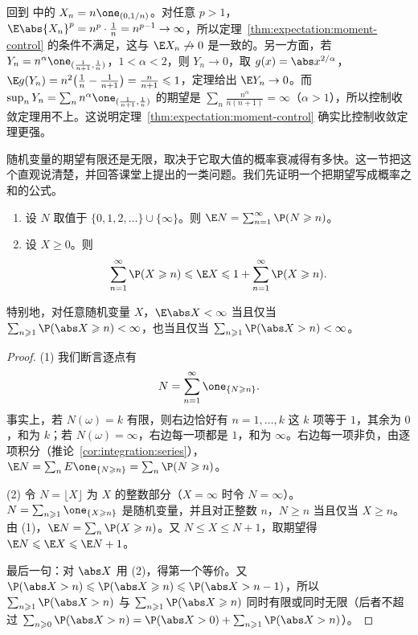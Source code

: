 \begin{example}
回到 中的 $X_n=n\one_{(0,1/n)}$。对任意 $p>1$，$\E\abs{X_n}^p=n^p\cdot\frac1n=n^{p-1}\to\infty$，所以定理~\ref{thm:expectation:moment-control} 的条件不满足，这与 $\E X_n\not\to0$ 是一致的。另一方面，若 $Y_n=n^\alpha\one_{(\frac1{n+1},\frac1n)}$，$1<\alpha<2$，则 $Y_n\to0$，取 $g(x)=\abs x^{2/\alpha}$，$\E g(Y_n)=n^2\bigl(\frac1n-\frac1{n+1}\bigr)=\frac n{n+1}\leqslant1$，定理给出 $\E Y_n\to0$。而 $\sup_nY_n=\sum_nn^\alpha\one_{(\frac1{n+1},\frac1n)}$ 的期望是 $\sum_n\frac{n^\alpha}{n(n+1)}=\infty$（$\alpha>1$），所以控制收敛定理用不上。这说明定理~\ref{thm:expectation:moment-control} 确实比控制收敛定理更强。
\end{example}


随机变量的期望有限还是无限，取决于它取大值的概率衰减得有多快。这一节把这个直观说清楚，并回答课堂上提出的一类问题。我们先证明一个把期望写成概率之和的公式。

\begin{proposition}[期望与尾概率之和]\label{prop:expectation:tail-sum}
\begin{enumerate}
\item 设 $N$ 取值于 $\{0,1,2,\dots\}\cup\{\infty\}$。则 $\E N=\sum_{n=1}^\infty \P(N\geqslant n)$。
\item 设 $X\geqslant0$。则
\[
\sum_{n=1}^\infty \P(X\geqslant n)\leqslant \E X\leqslant1+\sum_{n=1}^\infty \P(X\geqslant n).
\]
\end{enumerate}
特别地，对任意随机变量 $X$，$\E\abs X<\infty$ 当且仅当 $\sum_{n\geqslant1}\P(\abs X\geqslant n)<\infty$，也当且仅当 $\sum_{n\geqslant1}\P(\abs X>n)<\infty$。
\end{proposition}
\begin{proof}
(1) 我们断言逐点有
\[
N=\sum_{n=1}^\infty\one_{\{N\geqslant n\}}.
\]
事实上，若 $N(\omega)=k$ 有限，则右边恰好有 $n=1,\dots,k$ 这 $k$ 项等于 $1$，其余为 $0$，和为 $k$；若 $N(\omega)=\infty$，右边每一项都是 $1$，和为 $\infty$。右边每一项非负，由逐项积分（推论~\ref{cor:integration:series}），$\E N=\sum_nE\one_{\{N\geqslant n\}}=\sum_n\P(N\geqslant n)$。

(2) 令 $N=\lfloor X\rfloor$ 为 $X$ 的整数部分（$X=\infty$ 时令 $N=\infty$）。$N=\sum_{n\geqslant1}\one_{\{X\geqslant n\}}$ 是随机变量，并且对正整数 $n$，$N\geqslant n$ 当且仅当 $X\geqslant n$。由 (1)，$\E N=\sum_n\P(X\geqslant n)$。又 $N\leqslant X\leqslant N+1$，取期望得 $\E N\leqslant \E X\leqslant \E N+1$。

最后一句：对 $\abs X$ 用 (2)，得第一个等价。又 $\P(\abs X>n)\leqslant \P(\abs X\geqslant n)\leqslant \P(\abs X>n-1)$，所以 $\sum_{n\geqslant1}\P(\abs X>n)$ 与 $\sum_{n\geqslant1}\P(\abs X\geqslant n)$ 同时有限或同时无限（后者不超过 $\sum_{n\geqslant0}\P(\abs X>n)=\P(\abs X>0)+\sum_{n\geqslant1}\P(\abs X>n)$）。
\end{proof}

